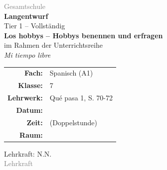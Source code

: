 \documentclass[11pt,a4paper]{article}
\newcommand{\fach}{Spanisch}
\newcommand{\jahrgangsstufe}{7}
\newcommand{\schulart}{Gesamtschule}
\newcommand{\stundenthema}{Los hobbys -- Hobbys benennen und erfragen}
\newcommand{\reihenthema}{Mi tiempo libre}
\newcommand{\lehrkraft}{N.N.}
\newcommand{\ausbildungsstand}{Lehrkraft}
\newcommand{\gerniveau}{A1}
\newcommand{\lehrwerk}{Qué pasa 1}
\newcommand{\lehrwerkseite}{S. 70-72}
\begin{document}
\begin{titlepage}
    \centering
    \vspace*{2cm}

    {\large\textcolor{gray}{\schulart}}\\[2cm]

    {\Huge\textcolor{fach}{\textbf{Langentwurf}}}\\[0.5cm]
    {\large Tier 1 -- Vollständig}\\[2cm]

    {\LARGE\textbf{\stundenthema}}\\[0.5cm]
    {\large im Rahmen der Unterrichtsreihe}\\[0.3cm]
    {\Large\textit{\reihenthema}}\\[2cm]

    \begin{tabular}{rl}
        \textbf{Fach:} & \fach{} (\gerniveau) \\[0.3cm]
        \textbf{Klasse:} & \jahrgangsstufe \\[0.3cm]
        \textbf{Lehrwerk:} & \lehrwerk, \lehrwerkseite \\[0.3cm]
        \textbf{Datum:} & \underline{\hspace{3cm}} \\[0.3cm]
        \textbf{Zeit:} & \underline{\hspace{3cm}} (Doppelstunde) \\[0.3cm]
        \textbf{Raum:} & \underline{\hspace{3cm}} \\[0.3cm]
    \end{tabular}

    \vfill

    {\large Lehrkraft: \lehrkraft}\\[0.3cm]
    {\normalsize\textcolor{gray}{\ausbildungsstand}}\\[1cm]

\end{titlepage}

\tableofcontents
\newpage

\end{document}
